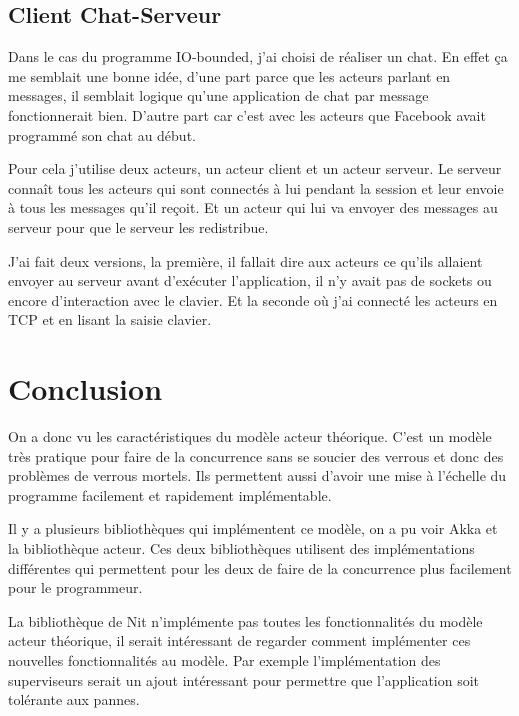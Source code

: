 \documentclass[11pt, a4paper]{article}
\begin{document}
\subsection{Client Chat-Serveur}
Dans le cas du programme IO-bounded, j'ai choisi de réaliser un chat. En effet ça me semblait une bonne idée, d'une part parce que les acteurs parlant en messages, il semblait logique qu'une application de chat par message fonctionnerait bien. D'autre part car c'est avec les acteurs que Facebook avait programmé son chat au début.
\par 
Pour cela j'utilise deux acteurs, un acteur client et un acteur serveur. Le serveur connaît tous les acteurs qui sont connectés à lui pendant la session et leur envoie à tous les messages qu'il reçoit. Et un acteur qui lui va envoyer des messages au serveur pour que le serveur les redistribue.
\par 
J'ai fait deux versions, la première, il fallait dire aux acteurs ce qu'ils allaient envoyer au serveur avant d'exécuter l'application, il n'y avait pas de sockets ou encore d'interaction avec le clavier. Et la seconde où j'ai connecté les acteurs en TCP et en lisant la saisie clavier.

\section{Conclusion}

On a donc vu les caractéristiques du modèle acteur théorique. C'est un modèle très pratique pour faire de la concurrence sans se soucier des verrous et donc des problèmes de verrous mortels. Ils permettent aussi d'avoir une mise à l'échelle du programme facilement et rapidement implémentable. 
\par Il y a plusieurs bibliothèques qui implémentent ce modèle, on a pu voir Akka et la bibliothèque acteur. Ces deux bibliothèques utilisent des implémentations différentes qui permettent pour les deux de faire de la concurrence plus facilement pour le programmeur.
\par La bibliothèque de Nit n'implémente pas toutes les fonctionnalités du modèle acteur théorique, il serait intéressant de regarder comment implémenter ces nouvelles fonctionnalités au modèle. Par exemple l'implémentation des superviseurs serait un ajout intéressant pour permettre que l'application soit tolérante aux pannes.


\end{document}
